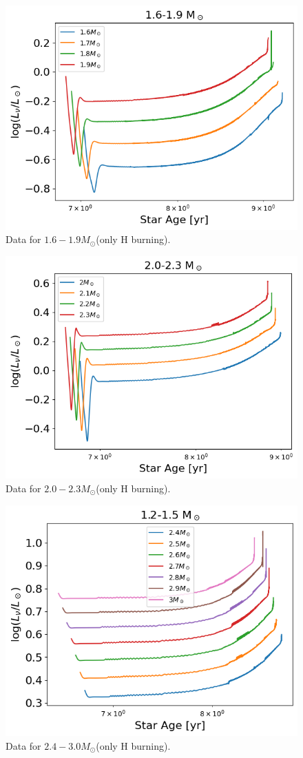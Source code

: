 \begin{figure}[H]
	\centering
	\includegraphics[width=\textwidth]{assets/Data1.6-1.9.png}
	\caption{Data for $1.6-1.9M_\odot$(only H burning).}
	\label{fig:1.6-1.9}
\end{figure}
\begin{figure}[H]
	\centering
	\includegraphics[width=\textwidth]{assets/Data2.0-2.3.png}
	\caption{Data for $2.0-2.3M_\odot$(only H burning).}
	\label{fig:2.0-2.3}
\end{figure}
\begin{figure}[H]
	\centering
	\includegraphics[width=\textwidth]{assets/Data2.4-3.0.png}
	\caption{Data for $2.4-3.0M_\odot$(only H burning).}
	\label{fig:2.4-3.0}
\end{figure}